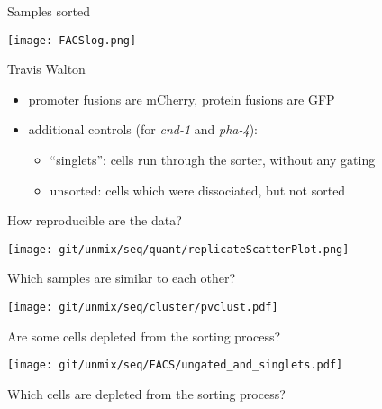 \documentclass[serif,9pt]{beamer}
\begin{document}
\begin{frame}{Samples sorted}

\texttt{[image: FACSlog.png]}

\hfill Travis Walton

\begin{itemize}

\item promoter fusions are mCherry, protein fusions are GFP

\item additional controls (for {\em cnd-1} and {\em pha-4}):

\begin{itemize}

\item ``singlets'': cells run through the sorter, without any gating

\item unsorted: cells which were dissociated, but not sorted

\end{itemize}

\end{itemize}

\end{frame}

\begin{frame}{How reproducible are the data?}

\texttt{[image: git/unmix/seq/quant/replicateScatterPlot.png]}

\end{frame}

\begin{frame}{Which samples are similar to each other?}

\texttt{[image: git/unmix/seq/cluster/pvclust.pdf]}

\end{frame}

\begin{frame}{Are some cells depleted from the sorting process?}

\texttt{[image: git/unmix/seq/FACS/ungated\_and\_singlets.pdf]}

\end{frame}

\begin{frame}{Which cells are depleted from the sorting process?}


\end{frame}
\end{document}
